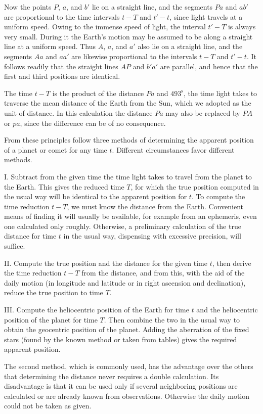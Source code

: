 Now the points $P$, $a$, and $b'$ lie on a straight line, and the segments $Pa$ and $ab'$ are proportional to the time intervals $t-T$ and $t'-t$, since light travels at a uniform speed. Owing to the immense speed of light, the interval $t'-T$ is always very small. During it the Earth's motion may be assumed to be along a straight line at a uniform speed. Thus $A$, $a$, and $a'$ also lie on a straight line, and the segments $Aa$ and $aa'$ are likewise proportional to the intervals $t-T$ and $t'-t$. It follows readily that the straight lines $AP$ and $b'a'$ are parallel, and hence that the first and third positions are identical.

The time $t-T$ is the product of the distance $Pa$ and $493^{\mathrm{s}}$, the time light takes to traverse the mean distance of the Earth from the Sun, which we adopted as the unit of distance. In this calculation the distance $Pa$ may also be replaced by $PA$ or $pa$, since the difference can be of no consequence.

From these principles follow three methods of determining the apparent position of a planet or comet for any time $t$. Different circumstances favor different methods.

I. Subtract from the given time the time light takes to travel from the planet to the Earth. This gives the reduced time $T$, for which the true position computed in the usual way will be identical to the apparent position for $t$. To compute the time reduction $t-T$, we must know the distance from the Earth. Convenient means of finding it will usually be available, for example from an ephemeris, even one calculated only roughly. Otherwise, a preliminary calculation of the true distance for time $t$ in the usual way, dispensing with excessive precision, will suffice.

II. Compute the true position and the distance for the given time $t$, then derive the time reduction $t-T$ from the distance, and from this, with the aid of the daily motion (in longitude and latitude or in right ascension and declination), reduce the true position to time $T$.

III. Compute the heliocentric position of the Earth for time $t$ and the heliocentric position of the planet for time $T$. Then combine the two in the usual way to obtain the geocentric position of the planet. Adding the aberration of the fixed stars (found by the known method or taken from tables) gives the required apparent position.

The second method, which is commonly used, has the advantage over the others that determining the distance never requires a double calculation. Its disadvantage is that it can be used only if several neighboring positions are calculated or are already known from observations. Otherwise the daily motion could not be taken as given.


